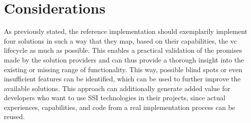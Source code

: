     \section{Considerations}\label{section: ri-considerations}
    As previously stated, the reference implementation should exemplarily implement four solutions in such a way that they map, based on their capabilities, the \ac{vc} lifecycle as much as possible. This enables a practical validation of the promises made by the solution providers and can thus provide a thorough insight into the existing or missing range of functionality. This way, possible blind spots or even insufficient features can be identified, which can be used to further improve the available solutions. This approach can additionally generate added value for developers who want to use \ac{SSI} technologies in their projects, since actual experiences, capabilities, and code from a real implementation process can be reused.
    
